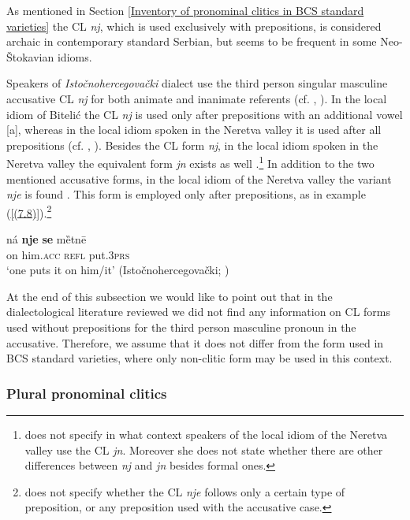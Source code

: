 As mentioned in Section \ref{Inventory of pronominal clitics in BCS standard varieties} the CL \textit{nj}, which is used exclusively with prepositions, is considered archaic in contemporary standard Serbian, but seems to be frequent in some Neo-Štokavian idioms. 

Speakers of \textit{Istočnohercegovački} dialect use the third person singular masculine accusative CL \textit{nj} for both animate and inanimate referents (cf. \citealt[200]{Peco07a}, \citealt[311]{Peco07b}). In the local idiom of Bitelić the CL \textit{nj} is used only after prepositions with an additional vowel [a], whereas in the local idiom spoken in the Neretva valley it is used after all prepositions (cf. \citealt[185]{Curkovic14}, \citealt[143]{VuksaNahod14}). Besides the CL form \textit{nj}, in the local idiom spoken in the Neretva valley the equivalent form \textit{jn} exists as well \citep[cf.][142f]{VuksaNahod14}.\footnote{\citet{VuksaNahod14} does not specify in what context speakers of the local idiom of the Neretva valley use the CL \textit{jn}. Moreover she does not state whether there are other differences between \textit{nj} and \textit{jn} besides formal ones.} In addition to the two mentioned accusative forms, in the local idiom of the Neretva valley the variant \textit{nje} is found \citep[cf.][143]{VuksaNahod14}. This form is employed only after prepositions, as in example (\ref{(7.8)}).\footnote{\citet{VuksaNahod14} does not specify whether the CL \textit{nje} follows only a certain type of preposition, or any preposition used with the accusative case.}

\begin{exe}
\ex\label{(7.8)}
\gll ná  \textbf{nje}  \textbf{se}  mȅtnē  \\
on him.\textsc{acc} \textsc{refl}  put.3\textsc{prs}  \\
\glt ‘one puts it on him/it’
\hfill  (Istočnohercegovački; \citealt[143]{VuksaNahod14})
\end{exe}

\noindent At the end of this subsection we would like to point out that in the dialectological literature reviewed we did not find any information on CL forms used without prepositions for the third person masculine pronoun in the accusative. Therefore, we assume that it does not differ from the form used in BCS standard varieties, where only non-clitic form may be used in this context.


\subsubsection{Plural pronominal clitics}
\label{Plural pronominal clitics in the accusative}

